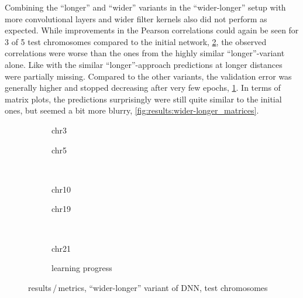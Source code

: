 Combining the ``longer'' and ``wider'' variants in the ``wider-longer'' setup with more convolutional layers and wider 
filter kernels also did not perform as expected.
While improvements in the Pearson correlations could again be seen for 3 of 5 test chromosomes compared to the initial network, \cref{fig:results:wider-longerDNN_pearson},
the observed correlations were worse than the ones from the highly similar ``longer''-variant alone. 
Like with the similar ``longer''-approach predictions at longer distances were partially missing. 
Compared to the other variants, the validation error was generally higher and stopped decreasing after very few epochs, \cref{fig:results:wider-longerDNN_lossEpochs}.
In terms of matrix plots, the predictions surprisingly were still quite similar to the initial ones, but seemed a bit more blurry, \ref{fig:results:wider-longer_matrices}.
\begin{figure}[p]%
    \begin{subfigure}{0.45\textwidth}
        \scriptsize
        \caption{chr3}
    \end{subfigure} \hfill
    \begin{subfigure}{0.45\textwidth}
        \scriptsize
        \caption{chr5}
    \end{subfigure}\\[5mm]
    \begin{subfigure}{0.45\textwidth}
        \scriptsize
        \caption{chr10}
    \end{subfigure}\hfill
    \begin{subfigure}{0.45\textwidth}
        \scriptsize
        \caption{chr19}
    \end{subfigure}\\[3mm]
    \centering
    \begin{subfigure}{0.45\textwidth}
        \scriptsize
        \caption{chr21}
    \end{subfigure}\hfill
    \begin{subfigure}{0.45\textwidth}
        \caption{learning progress} \label{fig:results:wider-longerDNN_lossEpochs}
    \end{subfigure}
    \caption{results\,/\,metrics, ``wider-longer'' variant of DNN,  test chromosomes}
    \label{fig:results:wider-longerDNN_pearson}
\end{figure}
